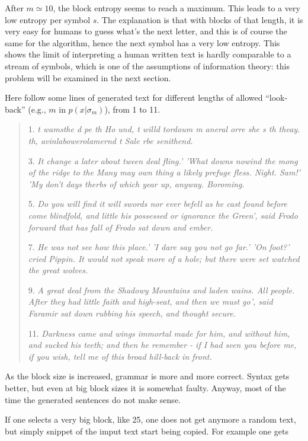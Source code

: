 \documentclass[conference]{IEEEtran}
\begin{document}
After $m \simeq 10$, the block entropy seems to reach a maximum. This leads to a very low entropy per symbol $s$. The explanation is that with blocks of that length, it is very easy for humans to guess what's the next letter, and this is of course the same for the algorithm, hence the next symbol has a very low entropy. This shows the limit of interpreting a human written text is hardly comparable to a stream of symbols, which is one of the assumptions of information theory: this problem will be examined in the next section.

Here follow some lines of generated text for different lengths of allowed ``look-back'' (e.g., $m$ in $p(x|\sigma_m)$), from 1 to 11.

\begin{quote}
1. \emph{t wamsthe d pe th Ho und, t willd tordoum m aneral orre she s th theay. th, avinlabowerolamernd t Sale rbe senithend.}

3. \emph{It change a later about tween deal fling.' 'What downs nowind the mong of the ridge to the Many may own thing a likely prefuge fless. Night. Sam!' 'My don't days therbs of which year up, anyway. Boroming.}

5. \emph{Do you will find it will swords nor ever befell as he cast found before come blindfold, and little his possessed or ignorance the Green', said Frodo forward that has fall of Frodo sat down and ember.}

7. \emph{He was not see how this place.' 'I dare say you not go far.' 'On foot?' cried Pippin. It would not speak more of a hole; but there were set watched the great wolves.}

9. \emph{A great deal from the Shadowy Mountains and laden wains. All people. After they had little faith and high-seat, and then we must go', said Faramir sat down rubbing his speech, and thought secure.}

11. \emph{Darkness came and wings immortal made for him, and without him, and sucked his teeth; and then he remember - if I had seen you before me, if you wish, tell me of this broad hill-back in front.}
\end{quote}

As the block size is increased, grammar is more and more correct. Syntax gets better, but even at big block sizes it is somewhat faulty. Anyway, most of the time the generated sentences do not make sense.

If one selects a very big block, like 25, one does not get anymore a random text, but simply snippet of the imput text start being copied. For example one gets
\end{document}
